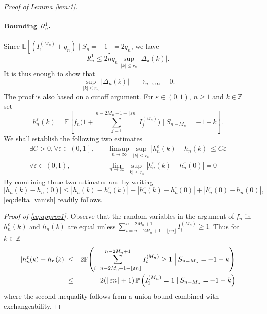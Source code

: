 \documentclass[a4paper,11pt]{article}
\newcommand{\E}{\mathbb{E}}
\DeclareRobustCommand{\P}{\mathbb{P}}
\DeclareRobustCommand{\1}{\mathbf{1}}
\newcommand{\Z}{\mathbb{Z}}
\begin{document}
\begin{proof}[Proof of Lemma \ref{lem:1}]
\paragraph{Bounding $R_n^1$.}
Since $\E[(I_1^{(M_n)}+q _{n})\mid S_n=-1] = 2 q_{n}$, we have
\[
  R_n^1 \leq 2n q_{n}\,\sup_{|k|\leq r_n}|\Delta_{n}(k)|.
\]
It is thus enough to show that
\begin{equation}
\label{eq:delta_vanish}\sup_{|k|\leq r_n}|\Delta_{n}(k)|  \quad \mathop{\longrightarrow}_{n \rightarrow \infty} \quad0.
\end{equation}
The proof is also based on a cutoff argument. For $\varepsilon \in (0,1)$, $n \geq 1$ and $k \in \Z$ set
$$
  h_n^{\varepsilon}(k) = \E\!\left[ f_{n}\big( 1 +\sum_{j=1}^{n-2M_{n}+1 - \lfloor \varepsilon n \rfloor} I^{(M_{n})}_j\big)  \;\Big|\; S_{n-M_{n}} = -1-k\right].$$
  We shall establish the following two estimates
  \begin{eqnarray}
\exists C>0,  \forall \varepsilon \in (0,1), & \quad \limsup_{n\to\infty}\sup_{|k|\leq r_n}|h_n^{\varepsilon}(k)-h_n(k)| \leq C\varepsilon \label{eq:approx1}\\
 \forall \varepsilon \in (0,1),&\quad  \lim_{n \rightarrow\infty} \sup_{|k|\leq r_n}|h_n^{\varepsilon}(k)-h_n^{\varepsilon}(0)|= 0   \label{eq:approx3}
\end{eqnarray}
By combining these two estimates and by writing
$$|h_n(k)-h_n(0)|  \leq  |h_n(k)-h_n^{\varepsilon}(k)| +  |h_n^{\varepsilon}(k)-h_n^{\varepsilon}(0)|  + |h_n^{\varepsilon}(0)-h_n(0)|,$$
\eqref{eq:delta_vanish} readily follows.
  
  
  
  
  
  

\emph{Proof of \eqref{eq:approx1}.}  Observe that the random variables in the argument of $f_{n}$ in $h_n^{\varepsilon}(k)$ and  $h_n(k)$ are equal unless  $\sum_{i=n-2M_{n}+1-\lfloor \varepsilon n \rfloor}^{n-2M_{n}+1} I_i^{(M_{n})} \geq 1$. Thus for $k \in \Z$
\begin{eqnarray}
 |h_n^\varepsilon(k)-h_n(k)| &\leq& 2 \P\!\left(\sum_{i=n-2M_{n}+1-\lfloor \varepsilon n \rfloor}^{n-2M_{n}+1} I_i^{(M_{n})}  \geq 1\;\Big|\; S_{n-M_n}=-1-k\right) \notag \\
 & \leq& 2( \lfloor \varepsilon n \rfloor +1) \,\P\left( I_1^{(M_{n})}=1\mid S_{n-M_{n}}=-1-k\right) \label{eq:hne}
\end{eqnarray}
where the second inequality follows from a union bound combined with exchangeability. 


\end{proof}
\end{document}
